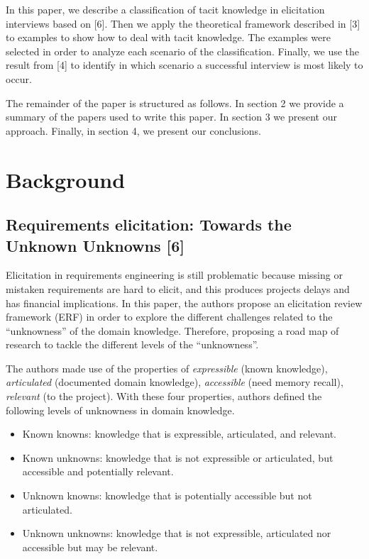 \documentclass[]{llncs}
\begin{document}
In this paper, we describe a classification of tacit knowledge in
elicitation interviews based on {[}6{]}. Then we apply the theoretical
framework described in {[}3{]} to examples to show how to deal with
tacit knowledge. The examples were selected in order to analyze each
scenario of the classification. Finally, we use the result from {[}4{]}
to identify in which scenario a successful interview is most likely to
occur.

The remainder of the paper is structured as follows. In section 2 we
provide a summary of the papers used to write this paper. In section 3
we present our approach. Finally, in section 4, we present our
conclusions.

\hypertarget{background}{%
\section{Background}\label{background}}

\hypertarget{requirements-elicitation-towards-the-unknown-unknowns-sutcliffe2013requirements}{%
\subsection{Requirements elicitation: Towards the Unknown Unknowns
{[}6{]}}\label{requirements-elicitation-towards-the-unknown-unknowns-sutcliffe2013requirements}}

Elicitation in requirements engineering is still problematic because
missing or mistaken requirements are hard to elicit, and this produces
projects delays and has financial implications. In this paper, the
authors propose an elicitation review framework (ERF) in order to
explore the different challenges related to the ``unknowness'' of the
domain knowledge. Therefore, proposing a road map of research to tackle
the different levels of the ``unknowness''.

The authors made use of the properties of \emph{expressible} (known
knowledge), \emph{articulated} (documented domain knowledge),
\emph{accessible} (need memory recall), \emph{relevant} (to the
project). With these four properties, authors defined the following
levels of unknowness in domain knowledge.

\begin{itemize}
\tightlist
\item
  Known knowns: knowledge that is expressible, articulated, and
  relevant.
\item
  Known unknowns: knowledge that is not expressible or articulated, but
  accessible and potentially relevant.
\item
  Unknown knowns: knowledge that is potentially accessible but not
  articulated.
\item
  Unknown unknowns: knowledge that is not expressible, articulated nor
  accessible but may be relevant.
\end{itemize}
\end{document}

